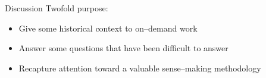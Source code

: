\documentclass[presentation]{subfiles}
\begin{document}
\begin{frame}{Discussion}
Twofold purpose:
\begin{itemize}
  \item Give some historical context to \alert{on--demand work}
  \item Answer some questions that have been difficult to answer
  \item Recapture attention toward a valuable sense--making methodology
\end{itemize}
\end{frame}
\end{document}
